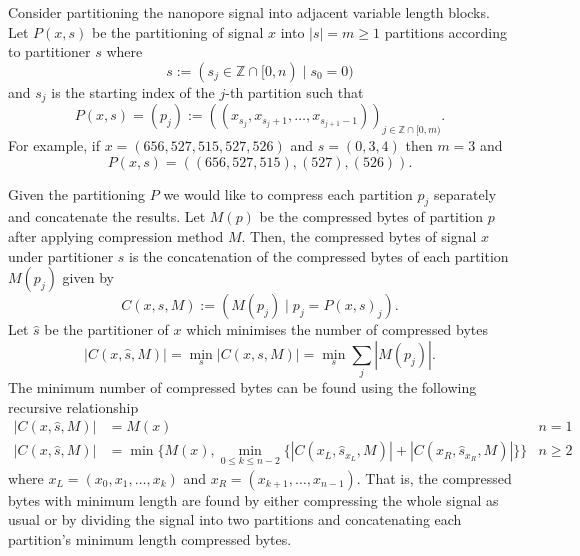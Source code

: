 
Consider partitioning the nanopore signal into adjacent variable length blocks.
Let $P(x,s)$ be the partitioning of signal $x$ into $|s|=m\ge 1$ partitions according to partitioner $s$ where
\[ s := (s_j \in \mathbb{Z}\cap [0, n) \mid s_0 = 0)\]
and $s_j$ is the starting index of the $j$-th partition such that
\[ P(x,s) = (p_j) := ((x_{s_j},x_{s_j+1},\dots,x_{s_{j+1}-1}))_{j\in\mathbb{Z}\cap[0,m)}.\]
For example, if $x=(656,527,515,527,526)$ and $s = (0,3,4)$ then $m=3$ and
\[P(x,s)=((656,527,515),(527),(526)).\]

Given the partitioning $P$ we would like to compress each partition $p_j$ separately and concatenate the results.
Let $M(p)$ be the compressed bytes of partition $p$ after applying compression method $M$.
Then, the compressed bytes of signal $x$ under partitioner $s$ is the concatenation of the compressed bytes of each partition $M(p_j)$ given by
\[ C(x,s,M) := (M(p_j)\mid p_j=P(x,s)_j). \]
Let $\hat s$ be the partitioner of $x$ which minimises the number of compressed bytes
\[ |C(x,\hat s,M)| = \min_s |C(x,s,M)| = \min_s \sum_j|M(p_j)|. \]
The minimum number of compressed bytes can be found using the following recursive relationship
\begin{align*}
	|C(x,\hat s,M)| &= M(x) & n = 1\\
	|C(x,\hat s,M)| &= \min\{M(x),\min_{0\le k\le n-2}\{|C(x_L,\hat s_{x_L},M)| + |C(x_R,\hat s_{x_R},M)|\}\} & n\ge 2
\end{align*}
where $x_L=(x_0,x_1,\dots,x_k)$ and $x_R=(x_{k+1},\dots,x_{n-1})$.
That is, the compressed bytes with minimum length are found by either compressing the whole signal as usual or by dividing the signal into two partitions and concatenating each partition's minimum length compressed bytes.


